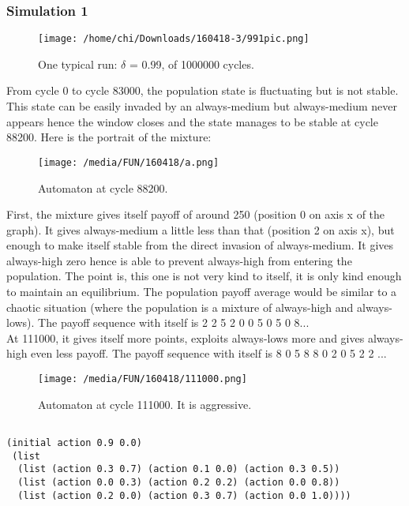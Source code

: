 \documentclass[12.5pt]{report}
\begin{document}
\subsubsection{Simulation 1}

\begin{figure}[h!]
\center
\texttt{[image: /home/chi/Downloads/160418-3/991pic.png]}
\caption{One typical run: $\delta$ = 0.99, of 1000000 cycles.}
\end{figure}

From cycle 0 to cycle 83000, the population state is fluctuating but is not stable. This state can be easily invaded by an always-medium but always-medium never appears hence the window closes and the state manages to be stable at cycle 88200. Here is the portrait of the mixture:

\begin{figure}[h!]
\center
\texttt{[image: /media/FUN/160418/a.png]}
\caption{Automaton at cycle 88200.}
\end{figure}

First, the mixture gives itself payoff of around 250 (position 0 on axis x of the graph). It gives always-medium a little less than that (position 2 on axis x), but enough to make itself stable from the direct invasion of always-medium. It gives always-high zero hence is able to prevent always-high from entering the population. The point is, this one is not very kind to itself, it is only kind enough to maintain an equilibrium. The population payoff average would be similar to a chaotic situation (where the population is a mixture of always-high and always-lows). The payoff sequence with itself is 2 2 5 2 0 0 5 0 5 0 8...\\

At 111000, it gives itself more points, exploits always-lows more and gives always-high even less payoff. The payoff sequence with itself is 8 0 5 8 8 0 2 0 5 2 2 ...\\
\begin{figure}[h!]
\center
\texttt{[image: /media/FUN/160418/111000.png]}
\caption{Automaton at cycle 111000. It is aggressive.}
\end{figure}

\begin{verbatim}

(initial action 0.9 0.0)
 (list
  (list (action 0.3 0.7) (action 0.1 0.0) (action 0.3 0.5))
  (list (action 0.0 0.3) (action 0.2 0.2) (action 0.0 0.8))
  (list (action 0.2 0.0) (action 0.3 0.7) (action 0.0 1.0))))

\end{verbatim}
\end{document}
